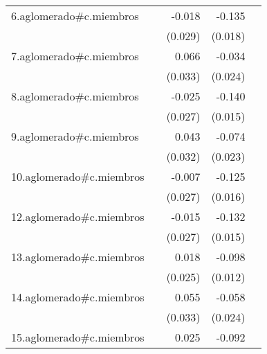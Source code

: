 {\begin{longtable}{l*{4}{D{.}{.}{-1}}}
\addlinespace
6.aglomerado#c.miembros&                     &      -0.018         &      -0.135\sym{***}&                     \\
            &                     &     (0.029)         &     (0.018)         &                     \\
\addlinespace
7.aglomerado#c.miembros&                     &       0.066\sym{*}  &      -0.034         &                     \\
            &                     &     (0.033)         &     (0.024)         &                     \\
\addlinespace
8.aglomerado#c.miembros&                     &      -0.025         &      -0.140\sym{***}&                     \\
            &                     &     (0.027)         &     (0.015)         &                     \\
\addlinespace
9.aglomerado#c.miembros&                     &       0.043         &      -0.074\sym{***}&                     \\
            &                     &     (0.032)         &     (0.023)         &                     \\
\addlinespace
10.aglomerado#c.miembros&                     &      -0.007         &      -0.125\sym{***}&                     \\
            &                     &     (0.027)         &     (0.016)         &                     \\
\addlinespace
12.aglomerado#c.miembros&                     &      -0.015         &      -0.132\sym{***}&                     \\
            &                     &     (0.027)         &     (0.015)         &                     \\
\addlinespace
13.aglomerado#c.miembros&                     &       0.018         &      -0.098\sym{***}&                     \\
            &                     &     (0.025)         &     (0.012)         &                     \\
\addlinespace
14.aglomerado#c.miembros&                     &       0.055         &      -0.058\sym{*}  &                     \\
            &                     &     (0.033)         &     (0.024)         &                     \\
\addlinespace
15.aglomerado#c.miembros&                     &       0.025         &      -0.092\sym{***}&                     \\

\end{longtable}}
